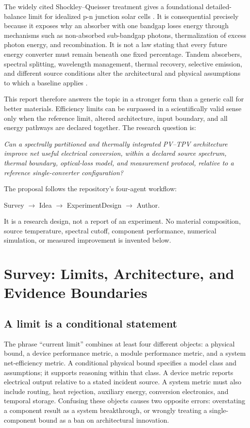 \documentclass[conference]{../../../../Conference-LaTeX-template_10-17-19/IEEEtran}
\begin{document}
The widely cited Shockley--Queisser treatment gives a foundational detailed-balance limit for idealized p-n junction solar cells \cite{shockley_queisser_1961}. It is consequential precisely because it exposes why an absorber with one bandgap loses energy through mechanisms such as non-absorbed sub-bandgap photons, thermalization of excess photon energy, and recombination. It is not a law stating that every future energy converter must remain beneath one fixed percentage. Tandem absorbers, spectral splitting, wavelength management, thermal recovery, selective emission, and different source conditions alter the architectural and physical assumptions to which a baseline applies \cite{shah_etal_2023,anctil_etal_2023,alharbi_kais_2015}.

This report therefore answers the topic in a stronger form than a generic call for better materials. Efficiency limits can be surpassed in a scientifically valid sense only when the reference limit, altered architecture, input boundary, and all energy pathways are declared together. The research question is:

\emph{Can a spectrally partitioned and thermally integrated PV--TPV architecture improve net useful electrical conversion, within a declared source spectrum, thermal boundary, optical-loss model, and measurement protocol, relative to a reference single-converter configuration?}

The proposal follows the repository's four-agent workflow:
\begin{center}
Survey $\rightarrow$ Idea $\rightarrow$ ExperimentDesign $\rightarrow$ Author.
\end{center}
It is a research design, not a report of an experiment. No material composition, source temperature, spectral cutoff, component performance, numerical simulation, or measured improvement is invented below.

\section{Survey: Limits, Architecture, and Evidence Boundaries}
\subsection{A limit is a conditional statement}
The phrase ``current limit'' combines at least four different objects: a physical bound, a device performance metric, a module performance metric, and a system net-efficiency metric. A conditional physical bound specifies a model class and assumptions; it supports reasoning within that class. A device metric reports electrical output relative to a stated incident source. A system metric must also include routing, heat rejection, auxiliary energy, conversion electronics, and temporal storage. Confusing these objects causes two opposite errors: overstating a component result as a system breakthrough, or wrongly treating a single-component bound as a ban on architectural innovation.
\end{document}
